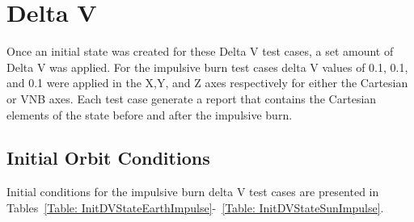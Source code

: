 \chapter{Delta V}
\label{Ch:DeltaV}

Once an initial state was created for these Delta V test cases, a
set amount of Delta V was applied. For the impulsive burn test cases
delta V values of 0.1, 0.1, and 0.1 were applied in the X,Y, and Z
axes respectively for either the Cartesian or VNB axes. Each test
case generate a report that contains the Cartesian elements of the
state before and after the impulsive burn.

\section{Initial Orbit Conditions}
Initial conditions for the impulsive burn delta V test cases are
presented in Tables~\ref{Table:
InitDVStateEarthImpulse}-~\ref{Table: InitDVStateSunImpulse}.

